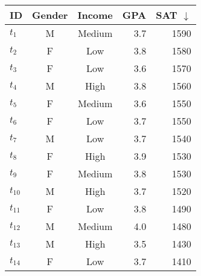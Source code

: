 \begin{table}[t]
\begin{center}
\hspace{-1cm}
\begin{minipage}{0.6\linewidth}
        \centering
		\caption{\candidates{}}
		\label{tab:candidates}
        \footnotesize
		\begin{tabular}{lccrr}
		\hline
		\textbf{ID} & \textbf{Gender} & \textbf{Income} & \textbf{GPA} & \textbf{SAT $\downarrow$} \\ \hline
		$t_1$           & M               & Medium         & 3.7      & 1590 \\    
		$t_2$           & F               & Low         & 3.8      & 1580 \\    
		$t_3$           & F               & Low         & 3.6      & 1570 \\    
		$t_4$           & M               & High         & 3.8      & 1560 \\    
		$t_5$           & F               & Medium         & 3.6      & 1550 \\    
		$t_6$           & F               & Low         & 3.7      & 1550 \\    
		$t_7$           & M               & Low         & 3.7      & 1540 \\    
		$t_8$           & F               & High         & 3.9      & 1530 \\    
		$t_9$           & F               & Medium         & 3.8      & 1530 \\    
		$t_{10}$           & M               & High         & 3.7      & 1520 \\    
		$t_{11}$           & F               & Low         & 3.8      & 1490 \\    
		$t_{12}$           & M               & Medium         & 4.0      & 1480 \\    
		$t_{13}$           & M               & High         & 3.5      & 1430 \\  
  	$t_{14}$           & F               & Low         & 3.7      & 1410 \\  
        \hline
		\end{tabular}
\end{minipage}
\hspace{-2cm}
\begin{minipage}{.35\linewidth}
    \centering
    \caption{\internships{}}
    \label{tab:internships}
    \footnotesize
    \begin{tabular}{lc}
    \hline

\end{tabular}
\end{minipage}
\end{center}
\end{table}
